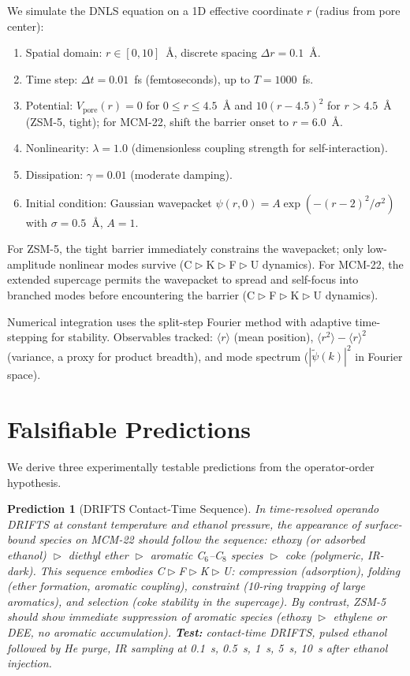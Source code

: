 \documentclass[11pt]{article}
\newtheorem{prediction}{Prediction}
\newcommand{\comp}{\mathrel{\triangleright}} %
\begin{document}
We simulate the DNLS equation on a 1D effective coordinate $r$ (radius from pore center):
\begin{enumerate}[itemsep=1pt]
\item Spatial domain: $r \in [0,10]$~\AA, discrete spacing $\Delta r = 0.1$~\AA.
\item Time step: $\Delta t = 0.01$~fs (femtoseconds), up to $T=1000$~fs.
\item Potential: $V_{\mathrm{pore}}(r) = 0$ for $0 \le r \le 4.5$~\AA{} and $10(r-4.5)^2$ for $r>4.5$~\AA{} (ZSM-5, tight); for MCM-22, shift the barrier onset to $r=6.0$~\AA.
\item Nonlinearity: $\lambda = 1.0$ (dimensionless coupling strength for self-interaction).
\item Dissipation: $\gamma = 0.01$ (moderate damping).
\item Initial condition: Gaussian wavepacket $\psi(r,0) = A\exp(-(r-2)^2/\sigma^2)$ with $\sigma=0.5$~\AA, $A=1$.
\end{enumerate}

For ZSM-5, the tight barrier immediately constrains the wavepacket; only low-amplitude nonlinear modes survive (C$\comp$K$\comp$F$\comp$U dynamics). For MCM-22, the extended supercage permits the wavepacket to spread and self-focus into branched modes before encountering the barrier (C$\comp$F$\comp$K$\comp$U dynamics).

Numerical integration uses the split-step Fourier method with adaptive time-stepping for stability. Observables tracked: $\langle r \rangle$ (mean position), $\langle r^2\rangle - \langle r\rangle^2$ (variance, a proxy for product breadth), and mode spectrum ($|\tilde\psi(k)|^2$ in Fourier space).

\section{Falsifiable Predictions}

We derive three experimentally testable predictions from the operator-order hypothesis.

\begin{prediction}[DRIFTS Contact-Time Sequence]
In time-resolved operando DRIFTS at constant temperature and ethanol pressure, the appearance of surface-bound species on MCM-22 should follow the sequence: ethoxy (or adsorbed ethanol) $\comp$ diethyl ether $\comp$ aromatic C$_6$--C$_8$ species $\comp$ coke (polymeric, IR-dark). This sequence embodies C$\comp$F$\comp$K$\comp$U: compression (adsorption), folding (ether formation, aromatic coupling), constraint (10-ring trapping of large aromatics), and selection (coke stability in the supercage). By contrast, ZSM-5 should show immediate suppression of aromatic species (ethoxy $\comp$ ethylene or DEE, no aromatic accumulation). \textbf{Test:} contact-time DRIFTS, pulsed ethanol followed by He purge, IR sampling at 0.1~s, 0.5~s, 1~s, 5~s, 10~s after ethanol injection.
\end{prediction}
\end{document}
